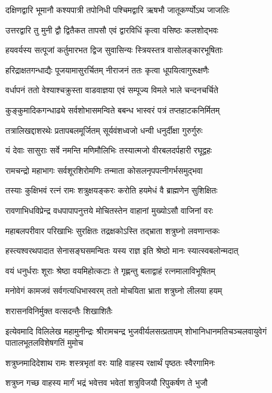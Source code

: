 \twolineshloka
{दक्षिणद्वारि भूमानौ कश्यपात्री तपोनिधी}
{पश्चिमद्वारि ऋषभौ जातूकर्ण्योऽथ जाजलिः}%

\twolineshloka
{उत्तरद्वारि तु मुनी द्वौ द्वितैकत तापसौ}
{एवं द्वारविधिं कृत्वा वसिष्ठः कलशोद्भवः}%

\twolineshloka
{हयवर्यस्य सत्पूजां कर्तुमारभत द्विज}
{सुवासिन्यः स्त्रियस्तत्र वासोलङ्कारभूषिताः}%

\twolineshloka
{हरिद्राक्षतगन्धाद्यैः पूजयामासुरर्चितम्}
{नीराजनं ततः कृत्वा धूपयित्वागुरूक्षणैः}%

\twolineshloka
{वर्धापनं ततो वेश्याश्चक्रुस्ता वाडवाज्ञया}
{एवं सम्पूज्य विमले भाले चन्दनचर्चिते}%

\twolineshloka
{कुङ्कुमादिकगन्धाढ्ये सर्वशोभासमन्विते}
{बबन्ध भास्वरं पत्रं तप्तहाटकनिर्मितम्}%

\twolineshloka
{तत्रालिखद्दाशरथेः प्रतापबलमूर्जितम्}
{सूर्यवंशध्वजो धन्वी धनुर्दीक्षा गुरुर्गुरुः}%

\twolineshloka
{यं देवाः सासुराः सर्वे नमन्ति मणिमौलिभिः}
{तस्यात्मजो वीरबलदर्पहारी रघूद्वहः}%

\twolineshloka
{रामचन्द्रो महाभागः सर्वशूरशिरोमणिः}
{तन्माता कोसलनृपपत्नीगर्भसमुद्भवा}%

\twolineshloka
{तस्याः कुक्षिभवं रत्नं रामः शत्रुक्षयङ्करः}
{करोति हयमेधं वै ब्राह्मणेन सुशिक्षितः}%

\twolineshloka
{रावणाभिधविप्रेन्द्र वधपापापनुत्तये}
{मोचितस्तेन वाहानां मुख्योऽसौ वाजिनां वरः}%

\twolineshloka
{महाबलपरीवार परिखाभिः सुरक्षितः}
{तद्रक्षकोऽस्ति तद्भ्राता शत्रुघ्नो लवणान्तकः}%

\twolineshloka
{हस्त्यश्वरथपादात सेनासङ्घसमन्वितः}
{यस्य राज्ञ इति श्रेष्ठो मानः स्यात्स्वबलोन्मदात्}%

\twolineshloka
{वयं धनुर्धराः शूराः श्रेष्ठा वयमिहोत्कटाः}
{ते गृह्णन्तु बलाद्वाहं रत्नमालाविभूषितम्}%

\twolineshloka
{मनोवेगं कामजवं सर्वगत्यधिभास्वरम्}
{ततो मोचयिता भ्राता शत्रुघ्नो लीलया हयम्}%

\onelineshloka
{शरासनविनिर्मुक्त वत्सदन्तैः शिखाशितैः}%

\fourlineindentedshloka
{इत्येवमादि विलिलेख महामुनीन्द्रः}
{श्रीरामचन्द्र भुजवीर्यलसत्प्रतापम्}
{शोभानिधानमतिचञ्चलवायुवेगं}
{पातालभूतलविशेषगतिं मुमोच}%

\twolineshloka
{शत्रुघ्नमादिदेशाथ रामः शस्त्रभृतां वरः}
{याहि वाहस्य रक्षार्थं पृष्ठतः स्वैरगामिनः}%

\twolineshloka
{शत्रुघ्न गच्छ वाहस्य मार्गं भद्रं भवेत्तव}
{भवेतां शत्रुविजयौ रिपुकर्षण ते भुजौ}%

